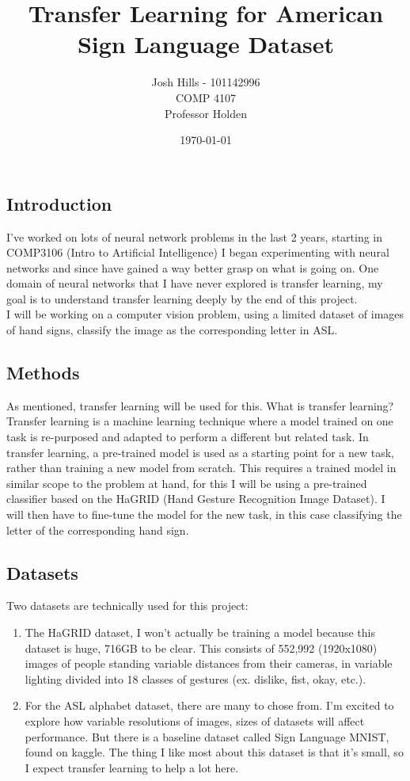 \documentclass[12pt]{article}
\title{Transfer Learning for American Sign Language Dataset}
\author{Josh Hills - 101142996\\COMP 4107\\Professor Holden}
\date{\today}
\begin{document}
\maketitle
\newpage
\subsection*{Introduction}
    I've worked on lots of neural network problems in the last 2 years, starting in COMP3106 (Intro to Artificial Intelligence)
    I began experimenting with neural networks and since have gained a way better grasp on what is going on.
    One domain of neural networks that I have never explored is transfer learning, my goal is to understand transfer
    learning deeply by the end of this project. \\
    I will be working on a computer vision problem, using a limited dataset of
    images of hand signs, classify the image as the corresponding letter in ASL. 

\subsection*{Methods}
    As mentioned, transfer learning will be used for this. What is transfer learning?
    Transfer learning is a machine learning technique where a model trained on one task is re-purposed and adapted to perform a different but related task. 
    In transfer learning, a pre-trained model is used as a starting point for a new task, rather than training a new model from scratch.
    This requires a trained model in similar scope to the problem at hand, for this I will be using a pre-trained classifier based 
    on the HaGRID (Hand Gesture Recognition Image Dataset). I will then have to fine-tune the model for the new task, 
    in this case classifying the letter of the corresponding hand sign.

\subsection*{Datasets}
    Two datasets are technically used for this project:
    \begin{enumerate}
        \item The HaGRID dataset, I won't actually be training a model because this dataset is huge, 716GB to be clear. This consists of 552,992 (1920x1080) images of people standing variable distances from their cameras, in variable lighting divided into 18 classes of gestures (ex. dislike, fist, okay, etc.). 
        \item For the ASL alphabet dataset, there are many to chose from. I'm excited to explore how variable resolutions of images, sizes of datasets will affect performance. But there is a baseline dataset called Sign Language MNIST, found on kaggle. The thing I like most about this dataset is that it's small, so I expect transfer learning to help a lot here.        
    \end{enumerate}
\end{document}
